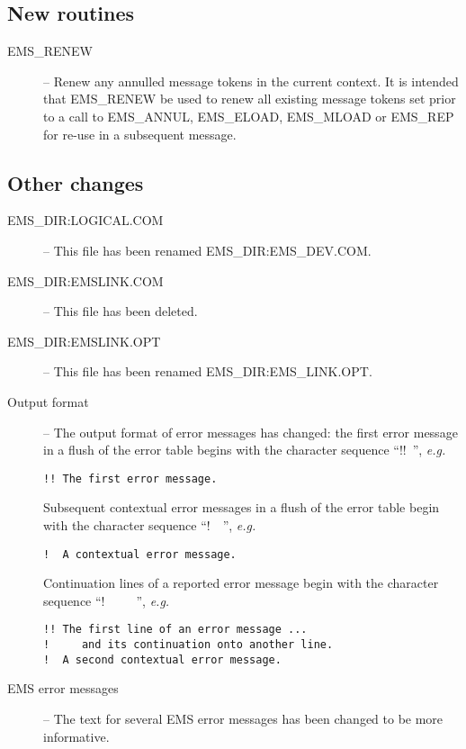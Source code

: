 \subsection {New routines}

\begin {description}
\item [EMS\_RENEW] -- Renew any annulled message tokens in the current
context. It is intended that EMS\_RENEW be used to renew all existing 
message tokens set prior to a call to EMS\_ANNUL, EMS\_ELOAD, EMS\_MLOAD or 
EMS\_REP for re-use in a subsequent message.
\end {description}

\subsection {Other changes}

\begin {description}
\item [EMS\_DIR:LOGICAL.COM] -- This file has been renamed 
EMS\_DIR:EMS\_DEV.COM.
\item [EMS\_DIR:EMSLINK.COM] -- This file has been deleted.
\item [EMS\_DIR:EMSLINK.OPT] -- This file has been renamed 
EMS\_DIR:EMS\_LINK.OPT.
\item [Output format] -- The output format of error messages has changed:
the first error message in a flush of the error table begins with the character
sequence ``!!~'', {\em e.g.}

\begin{verbatim}
!! The first error message.
\end{verbatim}

Subsequent contextual error messages in a flush of the error table begin with
the character sequence ``!~~'', {\em e.g.}

\begin{verbatim}
!  A contextual error message.
\end{verbatim}

Continuation lines of a reported error message begin with the character
sequence ``!~~~~~'', {\em e.g.}

\begin{verbatim}
!! The first line of an error message ...
!     and its continuation onto another line.
!  A second contextual error message.
\end{verbatim}
\item [EMS error messages] -- The text for several EMS error messages has been
changed to be more informative.
\end {description}


